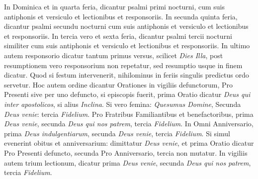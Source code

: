 \documentclass[11pt,openany]{book}
\begin{document}
\begin{multicols*}{2}
In Dominica et in quarta feria, dicantur psalmi primi nocturni, cum suis antiphonis et versiculo et lectionibus et responsoriis. In secunda quinta feria, dicantur psalmi secundu nocturni cum suis antiphonis et versiculo et lectionibus et responsoriis. In tercia vero et sexta feria, dicantur psalmi tercii nocturni similiter cum suis antiphonis et versiculo et lectionibus et responsoriis. In ultimo autem responsorio dicatur tantum primus versus, scilicet \textit{Dies Illa}, post resumptionem vero responsorium non repetatur, sed resumptio usque in finem dicatur. Quod si festum intervenerit, nihilominus in feriis singulis predictus ordo servetur.
Hoc autem ordine dicantur Orationes in vigiliis defunctorum, Pro Presenti sive per uno defuncto, si episcopis fuerit, prima Oratio dicatur \textit{Deus qui inter apostolicos}, si alius \textit{Inclina}. Si vero femina: \textit{Quesumus Domine}, Secunda \textit{Deus venie}: tercia \textit{Fidelium}. Pro Fratribus Familiantibus et benefactoribus, prima \textit{Deus venie}, secunda \textit{Deus qui nos patrem}, tercia \textit{Fidelium}.
In Omni Anniversario, prima \textit{Deus indulgentiarum}, secunda \textit{Deus venie}, tercia \textit{Fidelium}. Si simul evenerint obitus et anniversarium: dimittatur \textit{Deus venie}, et prima Oratio dicatur Pro Presenti defuncto, secunda Pro Anniversario, tercia non mutatur. In vigiliis autem trium lectionum, dicatur prima \textit{Deus venie}, secunda \textit{Deus qui nos patrem}, tercia \textit{Fidelium}.


\end{multicols*}
\end{document}
